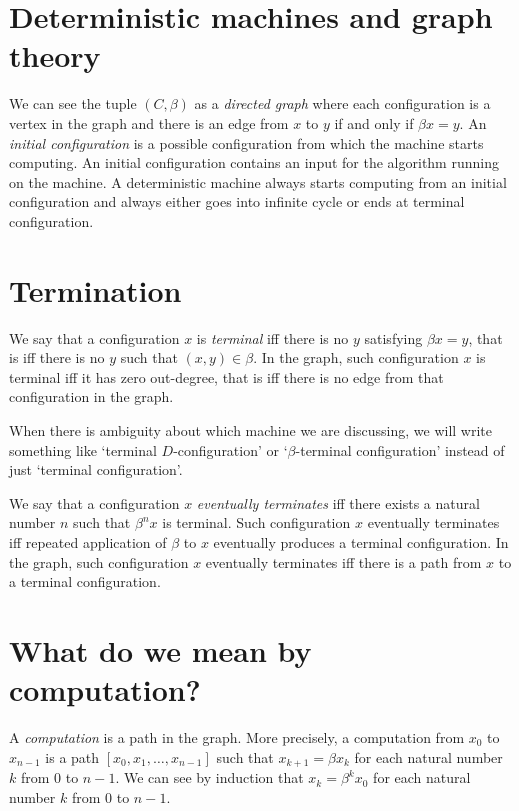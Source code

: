 \section{Deterministic machines and graph theory}

We can see the tuple $(C,\beta)$ as a \emph{directed graph}
where each configuration is a vertex in the graph
and there is an edge from $x$ to $y$ if and only if $\beta x = y$.
An \emph{initial configuration} is a possible configuration from which the machine starts computing.
An initial configuration contains an input for the algorithm running on the machine.
A deterministic machine always starts computing from an initial configuration
and always either goes into infinite cycle or ends at terminal configuration.

\section{Termination}

We say that a configuration $x$ is \emph{terminal} iff
there is no $y$ satisfying $\beta x = y$, that is iff there is no $y$ such that $(x,y) \in \beta$.
In the graph, such configuration $x$ is terminal iff it has zero out-degree,
that is iff there is no edge from that configuration in the graph.

When there is ambiguity about which machine we are discussing,
we will write something like `terminal $D$-configuration'
or `$\beta$-terminal configuration' instead of just `terminal configuration'.

We say that a configuration $x$ \emph{eventually terminates}
iff there exists a natural number $n$ such that $\beta^n x$ is terminal.
Such configuration $x$ eventually terminates iff repeated application of $\beta$ to $x$
eventually produces a terminal configuration.
In the graph, such configuration $x$ eventually terminates iff
there is a path from $x$ to a terminal configuration.

\section{What do we mean by computation?}

A \emph{computation} is a path in the graph.
More precisely, a computation from $x_0$ to $x_{n-1}$
is a path $[x_0, x_1, \ldots, x_{n-1}]$
such that $x_{k+1} = \beta x_k$ for each natural number $k$ from $0$ to $n-1$.
We can see by induction that $x_k = \beta^k x_0$ for each natural number $k$ from $0$ to $n-1$.

